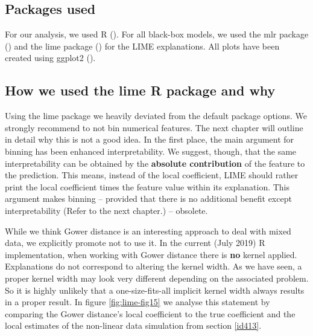 \documentclass[]{krantz}
\begin{document}
\subsection{Packages used}\label{id61}

For our analysis, we used R (\citet{R-base}). For all black-box models,
we used the mlr package (\citet{R-mlr}) and the lime package
(\citet{R-lime}) for the LIME explanations. All plots have been created
using ggplot2 (\citet{R-ggplot2}).

\subsection{How we used the lime R package and why}\label{id62}

Using the lime package we heavily deviated from the default package
options. We strongly recommend to not bin numerical features. The next
chapter will outline in detail why this is not a good idea. In the first
place, the main argument for binning has been enhanced interpretability.
We suggest, though, that the same interpretability can be obtained by
the \textbf{absolute contribution} of the feature to the prediction.
This means, instead of the local coefficient, LIME should rather print
the local coefficient times the feature value within its explanation.
This argument makes binning -- provided that there is no additional
benefit except interpretability (Refer to the next chapter.) --
obsolete.

While we think Gower distance is an interesting approach to deal with
mixed data, we explicitly promote not to use it. In the current (July
2019) R implementation, when working with Gower distance there is
\textbf{no} kernel applied. Explanations do not correspond to altering
the kernel width. As we have seen, a proper kernel width may look very
different depending on the associated problem. So it is highly unlikely
that a one-size-fits-all implicit kernel width always results in a
proper result. In figure \ref{fig:lime-fig15} we analyse this statement
by comparing the Gower distance's local coefficient to the true
coefficient and the local estimates of the non-linear data simulation
from section \ref{id413}.
\end{document}
